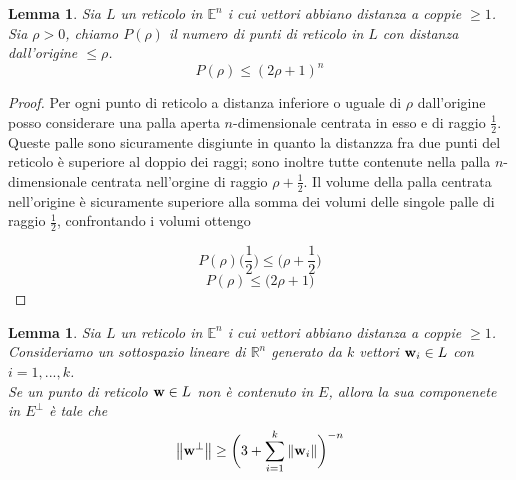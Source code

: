 \documentclass[10pt,a4paper]{book}
\newtheorem{lemma}[theorem]{Lemma}
\begin{document}
\begin{lemma}
Sia $L$ un reticolo in $\mathbb{E}^n$ i cui vettori abbiano distanza a coppie $\geq 1$. \\
Sia $\rho >0$, chiamo $P(\rho)$ il numero di punti di reticolo in $L$ con distanza dall'origine $\leq \rho$. 
\[ P(\rho) \leq (2 \rho +1)^n\]
\end{lemma}
\begin{proof}
Per ogni punto di reticolo a distanza inferiore o uguale di $\rho$ dall'origine posso considerare una palla aperta $n$-dimensionale centrata in esso e di raggio $\frac{1}{2}$. Queste palle sono sicuramente disgiunte in quanto la distanzza fra due punti del reticolo è superiore al doppio dei raggi; sono inoltre tutte contenute nella palla $n$-dimensionale centrata nell'orgine di raggio $ \rho + \frac{1}{2}$. 
Il volume della palla centrata nell'origine è sicuramente superiore alla somma dei volumi delle singole palle di raggio $\frac{1}{2}$, confrontando i volumi ottengo

\[ P(\rho) \bigg(  \frac{1}{2} \bigg) \leq \bigg( \rho + \frac{1}{2} \bigg) \]
\[ P(\rho) \leq \bigg( 2 \rho + 1 \bigg)\]
\end{proof}

\begin{lemma}
Sia $L$ un reticolo in $\mathbb{E}^n$ i cui vettori abbiano distanza a coppie $\geq 1$. \\ Consideriamo un sottospazio lineare di $\mathbb{R}^n$ generato da $k$ vettori $\vb{w}_i \in L$ con $i = 1,... ,k$. \\
Se un punto di reticolo $\vb{w} \in L$ non è contenuto in $E$, allora la sua componenete in $E^{\perp}$ è tale che 
\[ \norm{\vb{w}^{\perp}} \geq \bigg( 3 +  \sum_{i = 1}^{k} \norm{\vb{w}_i} \bigg)^{-n} \]
\end{lemma}
\end{document}
